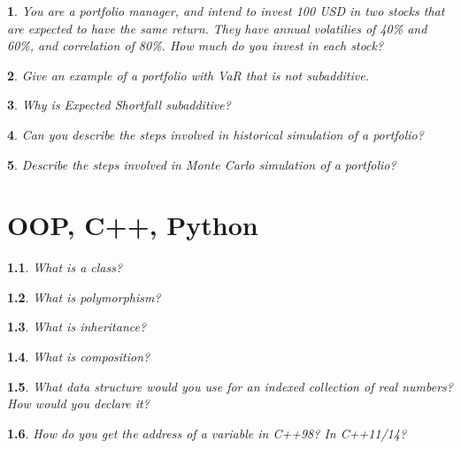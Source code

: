 \documentclass{report}
\newtheorem{problem}{}
\numberwithin{problem}{chapter} %
\begin{document}
\begin{problem}
\cite{CRACK} You are a portfolio manager, and intend to invest 100 USD in two stocks that are expected to have the same return. They have annual volatilies of 40\% and 60\%, and correlation of 80\%.  How much do you invest in each stock?
\end{problem}

\begin{problem}
Give an example of a portfolio with VaR that is not subadditive.
\end{problem}

\begin{problem}
Why is Expected Shortfall subadditive?
\end{problem}

\begin{problem}
Can you describe the steps involved in historical simulation of a portfolio?
\end{problem}

\begin{problem}
Describe the steps involved in Monte Carlo simulation of a portfolio?
\end{problem}

\chapter{OOP, C++, Python}

\begin{problem}
What is a class?
\end{problem}

\begin{problem}
What is polymorphism?
\end{problem}

\begin{problem}
What is inheritance? 
\end{problem}

\begin{problem}
What is composition?
\end{problem}

\begin{problem}
What data structure would you use for an indexed collection of real numbers? How would you declare it?
\end{problem}

\begin{problem}
How do you get the address of a variable in C++98? In C++11/14?
\end{problem}
\end{document}
